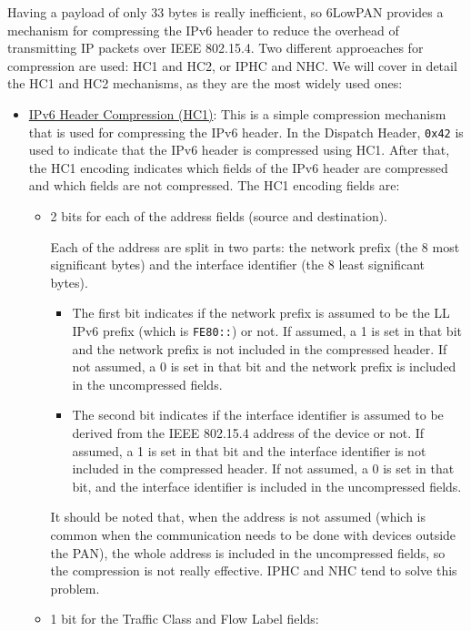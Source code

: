Having a payload of only 33 bytes is really inefficient, so 6LowPAN provides a mechanism for compressing the IPv6 header to reduce the overhead of transmitting IP packets over IEEE 802.15.4. Two different approeaches for compression are used: HC1 and HC2, or IPHC and NHC. We will cover in detail the HC1 and HC2 mechanisms, as they are the most widely used ones:
\begin{itemize}
    \item \ul{IPv6 Header Compression (HC1)}: This is a simple compression mechanism that is used for compressing the IPv6 header. In the Dispatch Header, \texttt{0x42} is used to indicate that the IPv6 header is compressed using HC1. After that, the HC1 encoding indicates which fields of the IPv6 header are compressed and which fields are not compressed. The HC1 encoding fields are:
    \begin{itemize}
        \item 2 bits for each of the address fields (source and destination).
        
        Each of the address are split in two parts: the network prefix (the 8 most significant bytes) and the interface identifier (the 8 least significant bytes).
        \begin{itemize}
            \item The first bit indicates if the network prefix is assumed to be the LL IPv6 prefix (which is \texttt{FE80::}) or not. If assumed, a 1 is set in that bit and the network prefix is not included in the compressed header. If not assumed, a 0 is set in that bit and the network prefix is included in the uncompressed fields.
            \item The second bit indicates if the interface identifier is assumed to be derived from the IEEE 802.15.4 address of the device or not. If assumed, a 1 is set in that bit and the interface identifier is not included in the compressed header. If not assumed, a 0 is set in that bit, and the interface identifier is included in the uncompressed fields.
        \end{itemize}

        It should be noted that, when the address is not assumed (which is common when the communication needs to be done with devices outside the PAN), the whole address is included in the uncompressed fields, so the compression is not really effective. IPHC and NHC tend to solve this problem.
        
        \item 1 bit for the Traffic Class and Flow Label fields:
        

\end{itemize}
\end{itemize}
